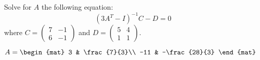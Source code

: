 
\begin{Exercise}[
name={},
title={}, 
difficulty=0,
origin={\cite{AG}}]
Solve for $A$ the following equation:
$$
(3A^T-I)^{-1}C-D=0
$$
where $C=\begin{pmatrix}
7&-1\\
6&-1
\end{pmatrix}
$
and $D=\begin{pmatrix}
5&4\\
1&1
\end{pmatrix}
$.
\end{Exercise}

\begin{Answer}
$
A=\begin{mat}
3 & \frac{7}{3}\\
-11 & -\frac{28}{3}
\end{mat}
$
\end{Answer}
